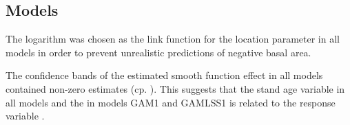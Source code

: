 \subsection{Models}

The logarithm was chosen as the link function for the location parameter in all models in order to prevent unrealistic predictions of negative basal area.

The confidence bands of the estimated smooth function effect in all models contained non-zero estimates (cp. ).  This suggests that the stand age variable in all models and the \ProductivityIndexVariableText{} in models GAM1 and GAMLSS1 is related to the response variable \parencite{Wood2001}.

